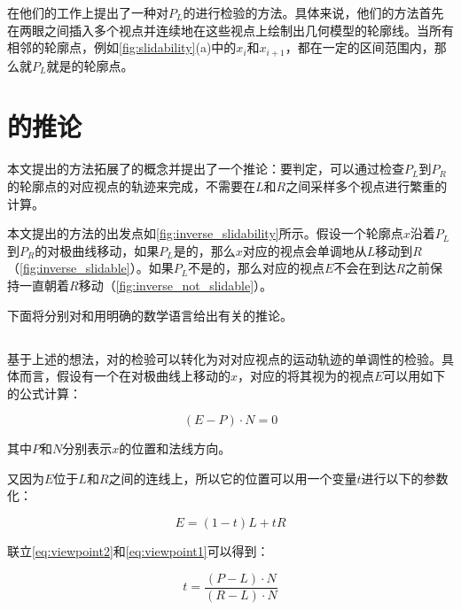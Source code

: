 \citeauthor{kim2013stereoscopic}在他们的工作上提出了一种对$P_L$的\epsl{}进行检验的方法。具体来说，他们的方法首先在两眼之间插入多个视点并连续地在这些视点上绘制出几何模型的轮廓线。当所有相邻的轮廓点，例如\autoref{fig:slidability}(a)中的$x_i$和$x_{i+1}$，都在一定的区间范围内，那么就$P_L$就是\epslb{}的轮廓点。

\section{\epsl{}的推论}

本文提出的方法拓展了\epsl{}的概念并提出了一个推论：要判定\epsl{}，可以通过检查$P_L$到$P_R$的轮廓点的对应视点的轨迹来完成，不需要在$L$和$R$之间采样多个视点进行繁重的计算\cite{kim2013stereoscopic}。

本文提出的方法的出发点如\autoref{fig:inverse_slidability}所示。假设一个轮廓点$x$沿着$P_L$到$P_R$的对极曲线移动，如果$P_L$是\epslb{}的，那么$x$对应的视点会单调地从$L$移动到$R$（\autoref{fig:inverse_slidable}）。如果$P_L$不是\epslb{}的，那么对应的视点$E$不会在到达$R$之前保持一直朝着$R$移动（\autoref{fig:inverse_not_slidable}）。

下面将分别对\con{}和\scon{}用明确的数学语言给出有关\epsl{}的推论。

\subsection{\con{}}

基于上述的想法，对\epsl{}的检验可以转化为对对应视点的运动轨迹的单调性的检验。具体而言，假设有一个在对极曲线上移动的\conp{}$x$，对应的将其视为\conp{}的视点$E$可以用如下的公式计算：

\begin{equation}\label{eq:viewpoint2}
    {(E - P)}\cdot{N} = 0
\end{equation}

其中$P$和$N$分别表示\conp{}$x$的位置和法线方向。

又因为$E$位于$L$和$R$之间的连线上，所以它的位置可以用一个变量$t$进行以下的参数化：

\begin{equation}\label{eq:viewpoint1}
    E = (1-t)L+t R
\end{equation}

联立\autoref{eq:viewpoint2}和\autoref{eq:viewpoint1}可以得到：

\begin{equation}\label{eq:t1}
t = \frac{(P-L)\cdot{N}}{(R-L)\cdot{N}}
\end{equation}

